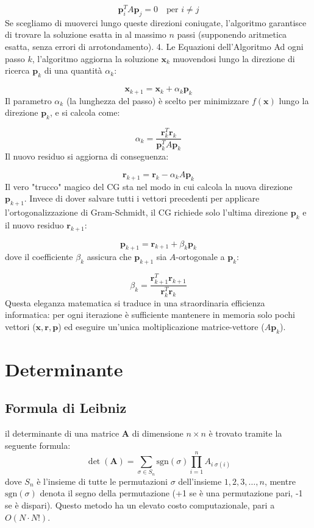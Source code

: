 \documentclass[10pt]{article}
\begin{document}
$$\mathbf{p}_i^T A \mathbf{p}_j = 0 \quad \text{per } i \neq j$$
Se scegliamo di muoverci lungo queste direzioni coniugate, l'algoritmo garantisce di trovare la soluzione esatta in al massimo $n$ passi (supponendo aritmetica esatta, senza errori di arrotondamento).
4. Le Equazioni dell'Algoritmo
Ad ogni passo $k$, l'algoritmo aggiorna la soluzione $\mathbf{x}_k$ muovendosi lungo la direzione di ricerca $\mathbf{p}_k$ di una quantità $\alpha_k$:

$$\mathbf{x}_{k+1} = \mathbf{x}_k + \alpha_k \mathbf{p}_k$$
Il parametro $\alpha_k$ (la lunghezza del passo) è scelto per minimizzare $f(\mathbf{x})$ lungo la direzione $\mathbf{p}_k$, e si calcola come:

$$\alpha_k = \frac{\mathbf{r}_k^T \mathbf{r}_k}{\mathbf{p}_k^T A \mathbf{p}_k}$$
Il nuovo residuo si aggiorna di conseguenza:

$$\mathbf{r}_{k+1} = \mathbf{r}_k - \alpha_k A \mathbf{p}_k$$
Il vero "trucco" magico del CG sta nel modo in cui calcola la nuova direzione $\mathbf{p}_{k+1}$. Invece di dover salvare tutti i vettori precedenti per applicare l'ortogonalizzazione di Gram-Schmidt, il CG richiede solo l'ultima direzione $\mathbf{p}_k$ e il nuovo residuo $\mathbf{r}_{k+1}$:

$$\mathbf{p}_{k+1} = \mathbf{r}_{k+1} + \beta_k \mathbf{p}_k$$
dove il coefficiente $\beta_k$ assicura che $\mathbf{p}_{k+1}$ sia $A$-ortogonale a $\mathbf{p}_k$:

$$\beta_k = \frac{\mathbf{r}_{k+1}^T \mathbf{r}_{k+1}}{\mathbf{r}_k^T \mathbf{r}_k}$$
Questa eleganza matematica si traduce in una straordinaria efficienza informatica: per ogni iterazione è sufficiente mantenere in memoria solo pochi vettori ($\mathbf{x}, \mathbf{r}, \mathbf{p}$) ed eseguire un'unica moltiplicazione matrice-vettore ($A \mathbf{p}_k$).




\section{Determinante}

\subsection{Formula di Leibniz}

il determinante di una matrice $\mathbf{A}$ di dimensione $n\times n$ è trovato tramite la seguente formula:
\begin{equation}
\det(\mathbf{A}) = \sum_{\sigma\in S_n} \text{sgn}(\sigma) \prod_{i=1}^n A_{i\;\sigma(i)}
\end{equation}
dove $S_n$ è l'insieme di tutte le permutazioni $\sigma$ dell'insieme ${1,2,3,\ldots,n}$, mentre $\text{sgn}(\sigma)$ denota il segno della permutazione (+1 se è una permutazione pari, -1 se è dispari).
Questo metodo ha un elevato costo computazionale, pari a $O(N\cdot N!)$.
\end{document}
